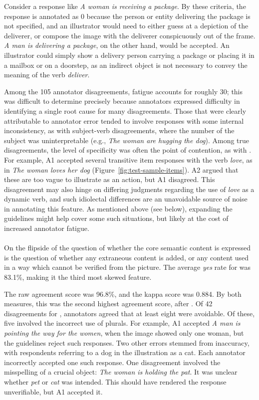 Consider a response like \textit{A woman is receiving a package}.  By these criteria, the response is annotated as 0 because the person or entity delivering the package is not specified, and an illustrator would need to either guess at a depiction of the deliverer, or compose the image with the deliverer conspicuously out of the frame. \textit{A man is delivering a package}, on the other hand, would be accepted. An illustrator could simply show a delivery person carrying a package or placing it in a mailbox or on a doorstep, as an indirect object is not necessary to convey the meaning of the verb \textit{deliver}.

Among the 105 annotator disagreements, fatigue accounts for roughly 30; this was difficult to determine precisely because annotators expressed difficulty in identifying a single root cause for many disagreements. Those that were clearly attributable to annotator error tended to involve responses with some internal inconsistency, as with subject-verb disagreements, where the number of the subject was uninterpretable (e.g., \textit{The woman are hugging the dog}). Among true disagreements, the level of specificity was often the point of contention, as with . For example, A1 accepted several transitive item responses with the verb \textit{love}, as in \textit{The woman loves her dog} (Figure~\ref{fig:test-sample-items}). A2 argued that these are too vague to illustrate as an action, but A1 disagreed. This disagreement may also hinge on differing judgments regarding the use of \textit{love} as a dynamic verb, and such idiolectal differences are an unavoidable source of noise in annotating this feature. As mentioned above (see  below), expanding the guidelines might help cover some such situations, but likely at the cost of increased annotator fatigue.

\paragraph{} On the flipside of the question of whether the core semantic content is expressed is the question of whether any extraneous content is added, or any content used in a way which cannot be verified from the picture.  The average \textit{yes} rate for  was 83.1\%, making it the third most skewed feature.

The raw agreement score was 96.8\%, and the kappa score was 0.884. By both measures, this was the second highest agreement score, after . Of 42 disagreements for , annotators agreed that at least eight were avoidable. Of these, five involved the incorrect use of plurals. For example, A1 accepted \textit{A man is pointing the way for the women}, when the image showed only one woman, but the guidelines reject such responses. Two other errors stemmed from inaccuracy, with respondents referring to a dog in the illustration as a cat. Each annotator incorrectly accepted one such response. One disagreement involved the misspelling of a crucial object: \textit{The woman is holding the pat}. It was unclear whether \textit{pet} or \textit{cat} was intended. This should have rendered the response unverifiable, but A1 accepted it.

